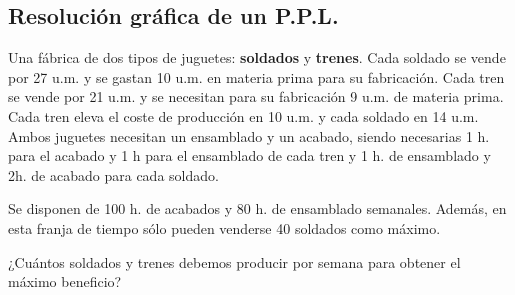 \newpage
\subsection{Resolución gráfica de un P.P.L.}

\begin{ejemplo}\label{ej2.2}
  Una fábrica de dos tipos de juguetes: \textbf{soldados} y \textbf{trenes}. Cada soldado se vende por 27 u.m. y se gastan 10 u.m. en materia prima para su fabricación. Cada tren se vende por 21 u.m. y se necesitan para su fabricación 9 u.m. de materia prima. Cada tren eleva el coste de producción en 10 u.m. y cada soldado en 14 u.m. Ambos juguetes necesitan un ensamblado y un acabado, siendo necesarias 1 h. para el acabado y 1 h para el ensamblado de cada tren y 1 h. de ensamblado y 2h. de acabado para cada soldado.\vspace*{0.3cm}
  
  Se disponen de 100 h. de acabados y 80 h. de ensamblado semanales. Además, en esta franja de tiempo sólo pueden venderse 40 soldados como máximo.\vspace*{0.3cm}
  
  ¿Cuántos soldados y trenes debemos producir por semana para obtener el máximo beneficio?
\end{ejemplo}


